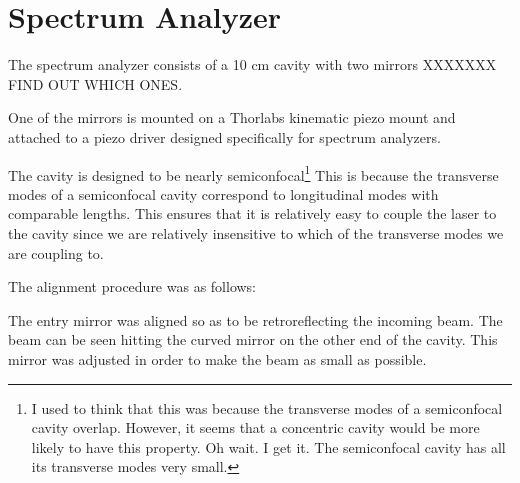\section{Spectrum Analyzer}

The spectrum analyzer consists of a 10 cm cavity with two mirrors XXXXXXX FIND OUT WHICH ONES. 

One of the mirrors is mounted on a Thorlabs kinematic piezo mount and attached to a piezo driver designed specifically for spectrum analyzers.

The cavity is designed to be nearly semiconfocal\footnote{I used to think that this was because the transverse modes of a semiconfocal cavity overlap. However, it seems that a concentric cavity would be more likely to have this property. Oh wait. I get it. The semiconfocal cavity has all its transverse modes very small.} This is because the transverse modes of a semiconfocal cavity correspond to longitudinal modes with comparable lengths. This ensures that it is relatively easy to couple the laser to the cavity since we are relatively insensitive to which of the transverse modes we are coupling to. 


The alignment procedure was as follows:

The entry mirror was aligned so as to be retroreflecting the incoming beam. The beam can be seen hitting the curved mirror on the other end of the cavity. This mirror was adjusted in order to make the beam as small as possible. 

